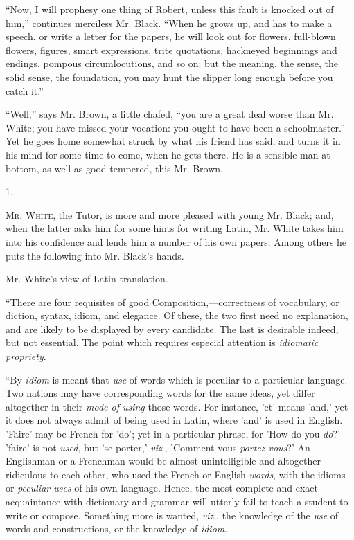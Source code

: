 ``Now, I will prophesy one thing of Robert, unless this fault
is knocked out of him,'' continues merciless Mr. Black. ``When
he grows up, and has to make a speech, or write a letter for the
papers, he will look out for flowers, full-blown flowers, figures,
smart expressions, trite quotations, hackneyed beginnings and endings,
pompous circumlocutions, and so on: but the meaning, the sense, the
solid sense, the foundation, you may hunt the slipper long enough
before you catch it.''

``Well,'' says Mr. Brown, a little chafed, ``you are a
great deal worse than Mr. White; you have missed your vocation: you
ought to have been a schoolmaster.'' Yet he goes home somewhat
struck by what his friend has said, and turns it in his mind for some
time to come, when he gets there. He is a sensible man at bottom, as
well as good-tempered, this Mr. Brown.


1.

M\textsc{r}. W\textsc{hite}, the Tutor, is more and more pleased with young Mr.
Black; and, when the latter asks him for some hints for writing Latin,
Mr. White takes him into his confidence and lends him a number of his
own papers. Among others he puts the following into Mr. Black's hands.

Mr. White's view of Latin translation.

``There are four requisites of good Composition,—correctness
of vocabulary, or diction, syntax, idiom, and elegance. Of these, the
two first need no explanation, and are likely to be displayed by every
candidate. The last is desirable indeed, but not essential. The point
which requires especial attention is \emph{idiomatic propriety}.

``By \emph{idiom} is meant that \emph{use} of words which is
peculiar to a particular language. Two nations may have corresponding
words for the same ideas, yet differ altogether in their \emph{mode of
using} those words. For instance, 'et' means 'and,' yet it does
not always admit of being used in Latin, where 'and' is used in
English. 'Faire' may be French for 'do'; yet in a particular phrase,
for 'How do you \emph{do}?' 'faire' is not \emph{used}, but 'se
porter,' \emph{viz}., 'Comment vous \emph{portez-vous}?' An Englishman
or a Frenchman would be almost unintelligible and altogether
ridiculous to each other, who used the French or English \emph{words},
with the idioms or \emph{peculiar uses} of his own language. Hence, the most complete and exact acquaintance with dictionary and
grammar will utterly fail to teach a student to write or compose.
Something more is wanted, \emph{viz}., the knowledge of the \emph{use}
of words and constructions, or the knowledge of \emph{idiom}.


